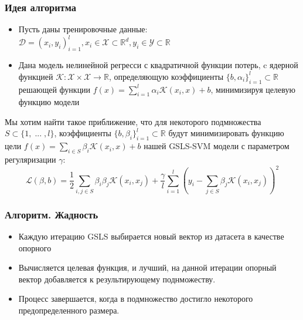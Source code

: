\documentclass{beamer}
\begin{document}
\begin{frame}
	\frametitle{Идея алгоритма}

	\begin{itemize}
		\item Пусть даны тренировочные данные:
		      $ \mathcal{D} = {(x_i, y_i)}_{i = 1}^{l}, x_i \in \mathcal{X} \subset
			      \mathbb{R}^d, y_i \in \mathcal{Y} \subset \mathbb{R}$
		\item Дана модель нелинейной регресси с квадратичной функции потерь,
		      c ядерной функцией $\mathcal{K} : \mathcal{X} \times
			      \mathcal{X} \rightarrow \mathbb{R}$,
		      определяющую коэффициенты $\{b, \alpha_i\}_{i =
			      1}^{l} \subset \mathbb{R}$
		      решающей функции
		      $f(x) = \sum_{i = 1}^{l} \alpha_i \mathcal{K}(x_i,
			      x) + b$, минимизируя целевую функцию модели

	\end{itemize}

	Мы хотим найти такое приближение, что для некоторого
	подмножества $S \subset \{1, \; ... \; , l \}$, коэффициенты $\{b,
		\beta_i\}_{i=1}^{l} \subset \mathbb{R}$ будут минимизировать функцию
	цели $f(x) = \sum_{i \in S} \beta_i \mathcal{K}(x_i, x) + b$
	нашей GSLS-SVM модели с параметром регуляризации $\gamma$:
	\vspace{-10pt}
	\begin{equation*}
		\mathcal{L}(\beta, b) = \frac{1}{2} \sum_{i,j \in S} \beta_i \beta_j
		\mathcal{K}(x_i, x_j)
		+ \frac{\gamma}{l} \sum_{i=1}^{l} (y_i - \sum_{j \in S} \beta_j
		\mathcal{K}(x_i, x_j))^2
	\end{equation*}

\end{frame}

\begin{frame}
	\frametitle{Алгоритм. Жадность}
	\begin{itemize}
		\item Каждую итерацию GSLS выбирается новый вектор из датасета в качестве
		      опорного
		\item Вычисляется целевая функция, и лучший, на данной итерации
		      опорный вектор добавляется к результирующему поднможеству.
		\item Процесс завершается, когда в подмножество достигло некоторого
		      предопределенного размера.
	\end{itemize}
\end{frame}
\end{document}
